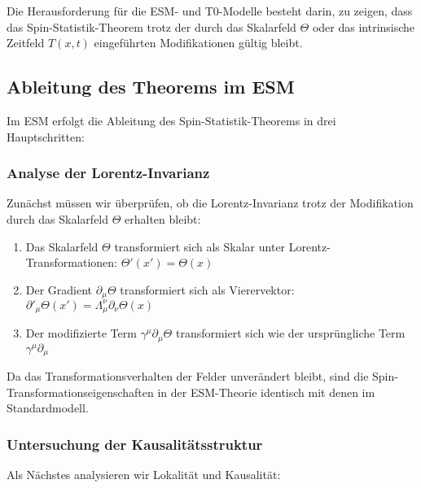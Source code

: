 \documentclass[12pt,a4paper]{article}
\newcommand{\Tfieldt}{T(x,t)}
\begin{document}
	Die Herausforderung für die ESM- und T0-Modelle besteht darin, zu zeigen, dass das Spin-Statistik-Theorem trotz der durch das Skalarfeld $\Theta$ oder das intrinsische Zeitfeld $\Tfieldt$ eingeführten Modifikationen gültig bleibt.
	
	\subsection{Ableitung des Theorems im ESM}
	\label{subsec:esm_derivation}
	
	Im ESM erfolgt die Ableitung des Spin-Statistik-Theorems in drei Hauptschritten:
	
	\subsubsection{Analyse der Lorentz-Invarianz}
	\label{subsubsec:lorentz_analysis}
	
	Zunächst müssen wir überprüfen, ob die Lorentz-Invarianz trotz der Modifikation durch das Skalarfeld $\Theta$ erhalten bleibt:
	
	\begin{enumerate}
		\item Das Skalarfeld $\Theta$ transformiert sich als Skalar unter Lorentz-Transformationen: $\Theta'(x') = \Theta(x)$
		\item Der Gradient $\partial_{\mu}\Theta$ transformiert sich als Vierervektor: $\partial'_{\mu}\Theta(x') = \Lambda^{\nu}_{\mu} \partial_{\nu}\Theta(x)$
		\item Der modifizierte Term $\gamma^{\mu}\partial_{\mu}\Theta$ transformiert sich wie der ursprüngliche Term $\gamma^{\mu}\partial_{\mu}$
	\end{enumerate}
	
	Da das Transformationsverhalten der Felder unverändert bleibt, sind die Spin-\\
	Transformationseigenschaften in der ESM-Theorie identisch mit denen im Standardmodell.
	
	\subsubsection{Untersuchung der Kausalitätsstruktur}
	\label{subsubsec:causality_examination}
	
	Als Nächstes analysieren wir Lokalität und Kausalität:
	
\end{document}
